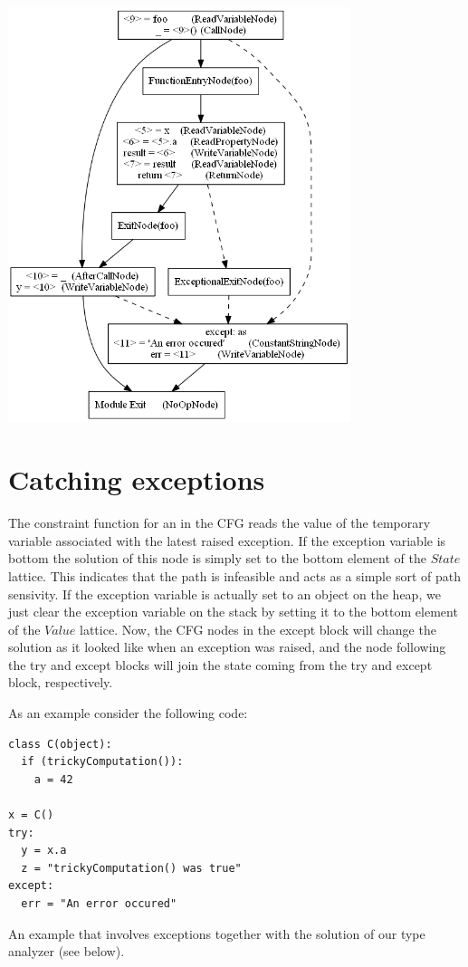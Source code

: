 \begin{listing}[H]
	\begin{center}
		\includegraphics[width=0.75\textwidth]{images/exception1.png}
	\end{center}
	\vspace{-10pt}
\end{listing}


\section{Catching exceptions}
The constraint function for an  in the CFG reads the value of the temporary variable associated with the latest raised exception. If the exception variable is bottom the solution of this node is simply set to the bottom element of the $State$ lattice. This indicates that the path is infeasible and acts as a simple sort of path sensivity. If the exception variable is actually set to an object on the heap, we just clear the exception variable on the stack by setting it to the bottom element of the $Value$ lattice. Now, the CFG nodes in the except block will change the solution as it looked like when an exception was raised, and the node following the try and except blocks will join the state coming from the try and except block, respectively.

As an example consider the following code:

\begin{listing}[H]
	\begin{verbatim}
class C(object):
  if (trickyComputation()):
    a = 42

x = C()
try:
  y = x.a
  z = "trickyComputation() was true"
except:
  err = "An error occured"
	\end{verbatim}
	\caption{An example that involves exceptions together with the solution of our type analyzer (see below).}
\end{listing}

